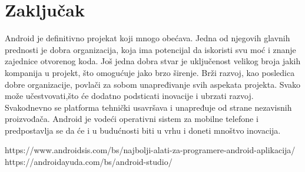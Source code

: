 \documentclass[12pt]{article}
\begin{document}
\section{Zaključak}

Android je definitivno projekat koji mnogo obećava. Jedna od njegovih glavnih prednosti je dobra organizacija, koja ima potencijal da iskoristi svu moć i znanje zajednice otvorenog koda. Još jedna dobra stvar je uključenost velikog broja jakih kompanija u projekt, što omogućuje jako brzo širenje.
Brži razvoj, kao posledica dobre organizacije, povlači za sobom unapređivanje svih aspekata projekta.
Svako može učestvovati,što će dodatno podsticati inovacije i ubrzati razvoj.
Svakodnevno se platforma tehnički usavršava i unapređuje od strane nezavisnih
proizvođača. Android je vodeći operativni sistem za mobilne telefone i predpostavlja se da će
i u budućnosti biti u vrhu i doneti mnoštvo inovacija.

\pagebreak
\begin{thebibliography}{}
\bibitem
\bibitem
\bibitem
\bibitem
\bibitem https://www.androidsis.com/bs/najbolji-alati-za-programere-android-aplikacija/
\bibitem https://androidayuda.com/bs/android-studio/
\end{thebibliography}
\end{document}
